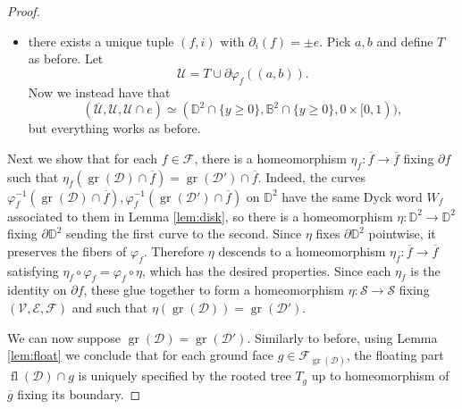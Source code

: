 \documentclass[11pt,reqno]{amsart}
\theoremstyle{plain}
\theoremstyle{definition}
\theoremstyle{remark}
\numberwithin{equation}{subsection}
\newcommand*{\bbB}{\mathbb{B}}
\newcommand*{\bbD}{\mathbb{D}}
\newcommand*{\calD}{\mathcal{D}}
\newcommand*{\calE}{\mathcal{E}}
\newcommand*{\calF}{\mathcal{F}}
\newcommand*{\calS}{\mathcal{S}}
\newcommand*{\calU}{\mathcal{U}}
\newcommand*{\calV}{\mathcal{V}}
\DeclareMathOperator{\gr}{gr}
\DeclareMathOperator{\fl}{fl}
\begin{document}
\begin{proof}
\begin{itemize}
        Next, let
        \[a'=(\partial\varphi_{f'}|_{(t_{i'-1},t_{i'})})^{-1}(\partial\varphi_f|_{(t_{i-1},t_i)}(a)),\quad b'=(\partial\varphi_{f'}|_{(t_{i'-1},t_{i'})})^{-1}(\partial\varphi_f|_{(t_{i-1},t_i)}(b))\]
        and likewise define
        \[T'=\varphi_{f'}(\{(r\cos(2\pi t),r\sin(2\pi t))\mid r\in(0,1),t\in(a',b')\})\subset\Delta_{i'}(f').\]
        Finally, let
        \[\calU=T\cup T'\cup\partial\varphi_f((a,b)).\]
        Then, we have that $\calU$ is open, $\calU\cap e=\partial\varphi_f((a,b))$ is connected containing both $\calD\cap e,\calD'\cap e$, which satisfies the equalities \eqref{eq:closureU}. Moreover,
        \[(\overline{\calU},\calU,\calU\cap e)\simeq(\bbD^2,\bbB^2,0\times(-1,1))\]
        so it is easy to find a homeomorphism $\overline{\calU}\to\overline{\calU}$ with the desired properties.
        \item[$\underline{e\subset\partial\calS}$:] there exists a unique tuple $(f,i)$ with $\partial_i(f)=\pm e$. Pick $a,b$ and define $T$ as before. Let
        \[\calU=T\cup\partial\varphi_f((a,b)).\]
        Now we instead have that
        \[(\overline{\calU},\calU,\calU\cap e)\simeq(\bbD^2\cap\{y\ge0\},\bbB^2\cap\{y\ge0\},0\times[0,1)),\]
        but everything works as before.
    \end{itemize}

    Next we show that for each $f\in\calF$, there is a homeomorphism $\eta_f\colon\overline{f}\to\overline{f}$ fixing $\partial f$ such that $\eta_f(\gr(\calD)\cap\overline{f})=\gr(\calD')\cap\overline{f}$. Indeed, the curves $\varphi_f^{-1}(\gr(\calD)\cap\overline{f}), \varphi_f^{-1}(\gr(\calD')\cap\overline{f})$ on $\bbD^2$ have the same Dyck word $W_f$ associated to them in Lemma \ref{lem:disk}, so there is a homeomorphism $\eta\colon\bbD^2\to\bbD^2$ fixing $\partial\bbD^2$ sending the first curve to the second. Since $\eta$ fixes $\partial\bbD^2$ pointwise, it preserves the fibers of $\varphi_f$. Therefore $\eta$ descends to a homeomorphism $\eta_f\colon\overline{f}\to\overline{f}$ satisfying $\eta_f\circ\varphi_f=\varphi_f\circ\eta$, which has the desired properties. Since each $\eta_f$ is the identity on $\partial f$, these glue together to form a homeomorphism $\eta\colon\calS\to\calS$ fixing $(\calV,\calE,\calF)$ and such that $\eta(\gr(\calD))=\gr(\calD')$.

    We can now suppose $\gr(\calD)=\gr(\calD')$. Similarly to before, using Lemma \ref{lem:float} we conclude that for each ground face $g\in\calF_{\gr(\calD)}$, the floating part $\fl(\calD)\cap g$ is uniquely specified by the rooted tree $T_g$ up to homeomorphism of $\overline{g}$ fixing its boundary.
\end{proof}
\end{document}
